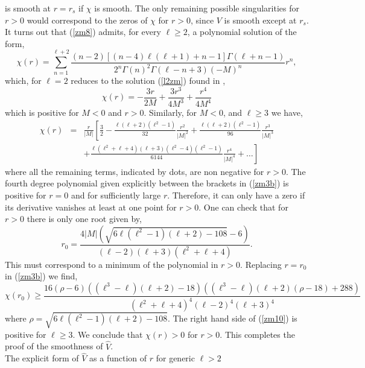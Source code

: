 \documentclass[aps,floats,showpacs,amssymb,tightenlines]{revtex4}
\begin{document}
is smooth at $r=r_s$ if $\chi$ is smooth.
The only remaining possible
  singularities for $r >0$ would correspond to the zeros of $\chi$ for $r>0$, since $V$ is smooth except at $r_s$.
   It turns out that (\ref{zm8}) admits, for every $\ell \geq 2$, a polynomial solution of the form,
\begin{equation} \label{zm3}
\chi(r)=\sum_{n=1}^{\ell+2}\frac{(n-2)\left[(n-4)\ell(\ell+1)+n-1\right]\Gamma(\ell+n-1)
}{ 2^{n}\Gamma(n)^2\Gamma(\ell-n+3) (-M)^{n}}r^n ,
\end{equation}
which, for $\ell=2$ reduces to the solution (\ref{l2zm}) found in \cite{ghi},
\begin{equation} \label{zm3a}
\chi(r)=-\frac{3r}{2M}+\frac{3r^3}{4M^3}+\frac{r^4}{4M^4}
\end{equation}
which is positive for $M<0$ and $r>0$. Similarly, for $M<0$, and $\ell \geq 3$ we have,
\begin{eqnarray} \label{zm3b}
\chi(r) & = & \frac{r}{|M|} \left[\frac{3}{2}-\frac{\ell(\ell+2)(\ell^2-1)}{32 } \frac{r^2}{|M|^2}+\frac{\ell(\ell+2)(\ell^2-1)}{96}\frac{ r^3}{|M|^3} \right.
\nonumber \\ & &\left. +
\frac{\ell(\ell^2+\ell+4)(\ell+3)(\ell^2-4)(\ell^2-1)}{6144}\frac{ r^4}{|M|^4}+\dots\right]
\end{eqnarray}
where all the remaining terms, indicated by dots, are non negative for $r>0$. The fourth degree polynomial given explicitly between the brackets in (\ref{zm3b}) is positive for $r=0$ and  for sufficiently large $r$. Therefore, it can only have a zero if its derivative vanishes at least at one point for $r>0$. One can check that for $r > 0$ there is only one root given by,
\begin{equation}\label{zm9}
r_0 = \frac{4|M|\left(\sqrt{6\ell(\ell^2-1)(\ell+2)-108}-6\right)}{(\ell-2)(\ell+3)(\ell^2+\ell+4)}.
\end{equation}
This must correspond to a minimum of the polynomial in $r > 0$.
Replacing $r=r_0$ in (\ref{zm3b}) we find,
\begin{equation}\label{zm10}
\chi(r_0) \geq \frac{16 (\rho-6)\left((\ell^3-\ell)(\ell+2)-18\right)\left((\ell^3-\ell)(\ell+2)(\rho-18)+288\right)}
{(\ell^2+\ell+4)^4(\ell-2)^4(\ell+3)^4}
\end{equation}
where $\rho=\sqrt{6\ell(\ell^2-1)(\ell+2)-108}$. The right hand side of (\ref{zm10}) is positive for $\ell \geq 3$. We conclude
 that $\chi(r) > 0$  for $r >0$. This completes  the proof of the smoothness of $\hat V$. \\
The explicit form of $\hat V$ as a function of $r$ for generic $\ell>2$
\end{document}
